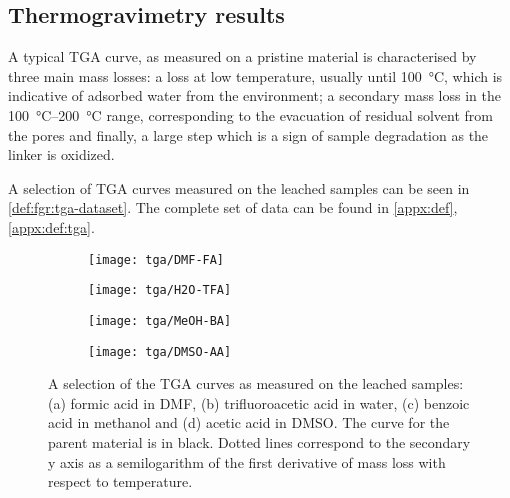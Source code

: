 
\subsection{Thermogravimetry results}

A typical TGA curve, as measured on a pristine material
is characterised by three main mass losses: a loss
at low temperature, usually until \SI{100}{\degreeCelsius},
which is indicative of adsorbed water from the environment;
a secondary mass loss in the \SIrange{100}{200}{\degreeCelsius}
range, corresponding to the evacuation of residual solvent 
from the pores and finally, a large step which is a sign of 
sample degradation as the linker is oxidized.

A selection of TGA curves measured on the leached samples
can be seen in \autoref{def:fgr:tga-dataset}. The complete set of data
can be found in \autoref{appx:def}, \autoref{appx:def:tga}.

\begin{figure}[htbp]
    \centering

    \begin{subfigure}{0.5\linewidth}
        \texttt{[image: tga/DMF-FA]}%
		\caption{}%
        \label{def:fgr:tga-dmf-fa}
    \end{subfigure}%
    \begin{subfigure}{0.5\linewidth}
        \texttt{[image: tga/H2O-TFA]}%
		\caption{}%
        \label{def:fgr:tga-h2o-tfa}
    \end{subfigure}%

    
    \begin{subfigure}{0.5\linewidth}
        \texttt{[image: tga/MeOH-BA]}%
		\caption{}%
        \label{def:fgr:tga-meoh-ba}
    \end{subfigure}%
    \begin{subfigure}{0.5\linewidth}
        \texttt{[image: tga/DMSO-AA]}%
		\caption{}%
        \label{def:fgr:tga-dmso-aa}
    \end{subfigure}%

    \caption{A selection of the TGA curves as measured on the
    leached samples: (a) formic acid in DMF, (b) trifluoroacetic
    acid in water, (c) benzoic acid in methanol and (d) acetic acid
    in DMSO. The curve for the parent material is in black. 
    Dotted lines correspond to the secondary y axis as a 
    semilogarithm of the first derivative of mass loss with 
    respect to temperature.}%
    \label{def:fgr:tga-dataset}
\end{figure}

